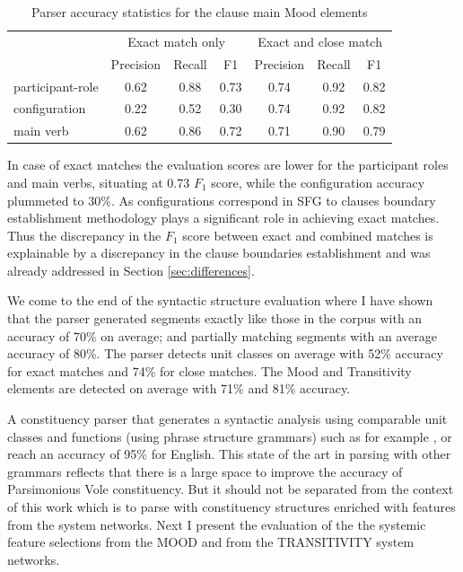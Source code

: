     \begin{table}[!ht]
    \centering
    \begin{tabular}{lcccccc}
    \toprule
     & \multicolumn{3}{c}{Exact match only} & \multicolumn{3}{c}{Exact and close match} \\ \cline{2-7} 
     & Precision & Recall & F1 & Precision & Recall & F1 \\ 
    \midrule
    participant-role &       0.62 &    0.88 & 0.73 &       0.74 &    0.92 & 0.82 \\
    configuration    &       0.22 &    0.52 & 0.30 &       0.74 &    0.92 & 0.82 \\
    main verb        &       0.62 &    0.86 & 0.72 &       0.71 &    0.90 & 0.79 \\ 
    \bottomrule
    \end{tabular}
    \caption{Parser accuracy statistics for the clause main Mood elements}
    \label{tab:unit-elements-transitivity-combined-F1}
    \end{table}
    
    In case of exact matches the evaluation scores are lower for the participant roles and main verbs, situating at 0.73 $F_1$ score, while the configuration accuracy plummeted to 30\%. As configurations correspond in SFG to clauses boundary establishment methodology plays a significant role in achieving exact matches. Thus the discrepancy in the $F_1$ score between exact and combined matches is explainable by a discrepancy in the clause boundaries establishment and was already addressed in Section \ref{sec:differences}. 
    
    We come to the end of the syntactic structure evaluation where I have shown that the parser generated segments exactly like those in the corpus with an accuracy of 70\% on average; and partially matching segments with an average accuracy of 80\%. The parser detects unit classes on average with 52\% accuracy for exact matches and 74\% for close matches. The Mood and Transitivity elements are detected on average with 71\% and 81\% accuracy. 
    
    A constituency parser that generates a syntactic analysis using comparable unit classes and functions (using phrase structure grammars) such as for example \citet{chen2014fast}, \citet{stern2017minimal} or \citet{kitaev2018multilingual} reach an accuracy of 95\% for English. This state of the art in parsing with other grammars reflects that there is a large space to improve the accuracy of Parsimonious Vole constituency. But it should not be separated from the context of this work which is to parse with constituency structures enriched with features from the system networks. Next I present the evaluation of the the systemic feature selections from the MOOD and from the TRANSITIVITY system networks. 
    

